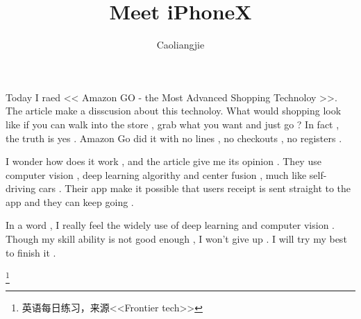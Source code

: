 \documentclass{ctexart}
\begin{document}
\title{Meet iPhoneX}
\author{Caoliangjie}
\maketitle
\par
Today I raed << Amazon GO - the Most Advanced Shopping Technoloy >>. The article make a disscusion about this technoloy. What would shopping
look like if you can walk into the store , grab what you want and just go ? In fact , the truth is yes . Amazon Go did it with no lines , no checkouts , no registers . 
\par
I wonder how does it work , and the article give me its opinion . They use computer vision , deep learning algorithy and center fusion , much like self-driving cars . Their app make it possible that users receipt is sent straight to the app and they can keep going .
\par
In a word , I really feel the widely use of deep learning and computer vision . Though my skill ability is not good enough , I won't give up . I will try my best to finish it . 

\footnote{\centering 英语每日练习，来源<<Frontier tech>>}
\end{document}
